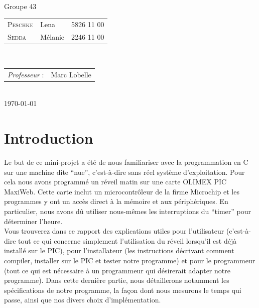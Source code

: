 \documentclass[12pt,a4paper]{article}
\begin{document}
\begin{titlepage}

\large
\begin{centering}
Groupe 43\\
\end{centering}
{\begin{tabular}{lll}
\textsc{Peschke} & Lena & 5826 11 00\\
\textsc{Sedda} & Mélanie & 2246 11 00\\
\end{tabular}}
\\[1cm]

\normalsize
{\begin{tabular}{ll}
\textit{Professeur} : & Marc Lobelle \\
\end{tabular}}
\\[1cm]


{\normalsize \today} %

\newpage

\end{titlepage}


\clearpage
\thispagestyle{empty}
\tableofcontents
\clearpage
{}


\section{Introduction}

Le but de ce mini-projet a été de nous familiariser avec la programmation en C sur une machine dite ``nue'', c'est-à-dire sans réel système d'exploitation. Pour cela nous avons programmé un réveil matin sur une carte OLIMEX PIC MaxiWeb. Cette carte inclut un microcontrôleur de la firme Microchip et les programmes y ont un accès direct à la mémoire et aux périphériques. En particulier, nous avons dû utiliser nous-mêmes les interruptions du ``timer'' pour déterminer l'heure.\\

Vous trouverez dans ce rapport des explications utiles pour l'utilisateur (c'est-à-dire tout ce qui concerne simplement l'utilisation du réveil lorsqu'il est déjà installé sur le PIC), pour l'installateur (les instructions décrivant comment compiler, installer sur le PIC et tester notre programme) et pour le programmeur (tout ce qui est nécessaire à un programmeur qui désirerait adapter notre programme). Dans cette dernière partie, nous détaillerons notamment les spécifications de notre programme, la façon dont nous mesurons le temps qui passe, ainsi que nos divers choix d'implémentation.
\end{document}
